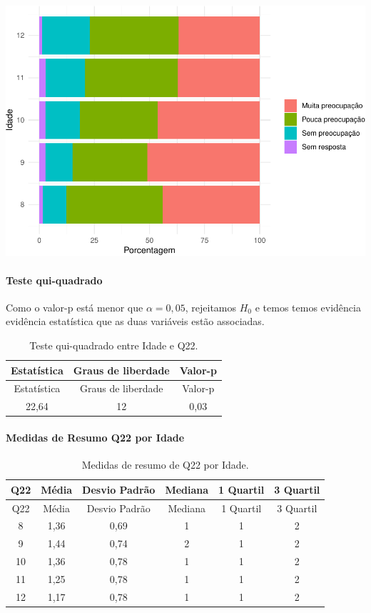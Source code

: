 \documentclass[]{article}
\let\oldparagraph\paragraph
\renewcommand{\paragraph}[1]{\oldparagraph{#1}\mbox{}}
\begin{document}
\begin{center}\includegraphics[width=0.75\linewidth]{relatorio_files/figure-latex/unnamed-chunk-386-1} \end{center}

\hypertarget{teste-qui-quadrado-45}{%
\paragraph{Teste qui-quadrado}\label{teste-qui-quadrado-45}}

Como o valor-p está menor que \(\alpha=0,05\), rejeitamos \(H_0\) e temos temos evidência evidência estatística que as duas variáveis estão associadas.

\begin{longtable}[]{@{}ccc@{}}
\caption{\label{tab:unnamed-chunk-387}Teste qui-quadrado entre Idade e Q22.}\tabularnewline
\toprule
Estatística & Graus de liberdade & Valor-p\tabularnewline
\midrule
\endfirsthead
\toprule
Estatística & Graus de liberdade & Valor-p\tabularnewline
\midrule
\endhead
22,64 & 12 & 0,03\tabularnewline
\bottomrule
\end{longtable}

\cleardoublepage

\hypertarget{medidas-de-resumo-q22-por-idade-1}{%
\paragraph{Medidas de Resumo Q22 por Idade}\label{medidas-de-resumo-q22-por-idade-1}}

\begin{longtable}[]{@{}cccccc@{}}
\caption{\label{tab:unnamed-chunk-388}Medidas de resumo de Q22 por Idade.}\tabularnewline
\toprule
Q22 & Média & Desvio Padrão & Mediana & 1 Quartil & 3 Quartil\tabularnewline
\midrule
\endfirsthead
\toprule
Q22 & Média & Desvio Padrão & Mediana & 1 Quartil & 3 Quartil\tabularnewline
\midrule
\endhead
8 & 1,36 & 0,69 & 1 & 1 & 2\tabularnewline
9 & 1,44 & 0,74 & 2 & 1 & 2\tabularnewline
10 & 1,36 & 0,78 & 1 & 1 & 2\tabularnewline
11 & 1,25 & 0,78 & 1 & 1 & 2\tabularnewline
12 & 1,17 & 0,78 & 1 & 1 & 2\tabularnewline
\bottomrule
\end{longtable}
\end{document}
